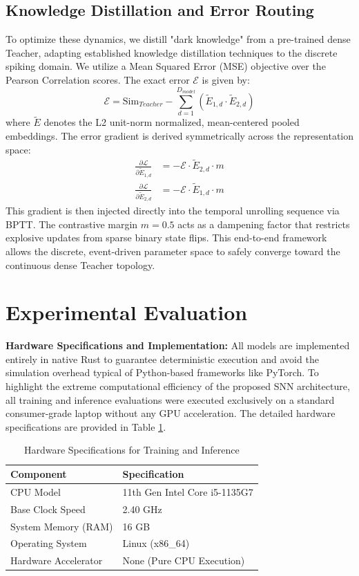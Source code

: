 \documentclass{article} %
\begin{document}
\subsection{Knowledge Distillation and Error Routing}
To optimize these dynamics, we distill "dark knowledge" from a pre-trained dense Teacher, adapting established knowledge distillation techniques \citep{hinton2015distilling} to the discrete spiking domain. We utilize a Mean Squared Error (MSE) objective over the Pearson Correlation scores. The exact error $\mathcal{E}$ is given by:
\begin{equation}
\mathcal{E} = \text{Sim}_{Teacher} - \sum_{d=1}^{D_{model}} \left(\tilde{E}_{1,d} \cdot \tilde{E}_{2,d}\right)
\end{equation}
where $\tilde{E}$ denotes the L2 unit-norm normalized, mean-centered pooled embeddings. The error gradient is derived symmetrically across the representation space:
\begin{align}
\frac{\partial \mathcal{L}}{\partial \tilde{E}_{1,d}} &= -\mathcal{E} \cdot \tilde{E}_{2,d} \cdot m \\
\frac{\partial \mathcal{L}}{\partial \tilde{E}_{2,d}} &= -\mathcal{E} \cdot \tilde{E}_{1,d} \cdot m
\end{align}
This gradient is then injected directly into the temporal unrolling sequence via BPTT. The contrastive margin $m=0.5$ acts as a dampening factor that restricts explosive updates from sparse binary state flips. This end-to-end framework allows the discrete, event-driven parameter space to safely converge toward the continuous dense Teacher topology.

\section{Experimental Evaluation}

\textbf{Hardware Specifications and Implementation:} All models are implemented entirely in native Rust to guarantee deterministic execution and avoid the simulation overhead typical of Python-based frameworks like PyTorch. To highlight the extreme computational efficiency of the proposed SNN architecture, all training and inference evaluations were executed exclusively on a standard consumer-grade laptop without any GPU acceleration. The detailed hardware specifications are provided in Table \ref{tab:hardware_specs}.

\begin{table}[ht]
\centering
\caption{Hardware Specifications for Training and Inference}
\begin{tabular}{ll}
\toprule
\textbf{Component} & \textbf{Specification} \\
\midrule
CPU Model & 11th Gen Intel Core i5-1135G7 \\
Base Clock Speed & 2.40 GHz \\
System Memory (RAM) & 16 GB \\
Operating System & Linux (x86\_64) \\
Hardware Accelerator & None (Pure CPU Execution) \\
\bottomrule
\end{tabular}
\label{tab:hardware_specs}
\end{table}
\end{document}
